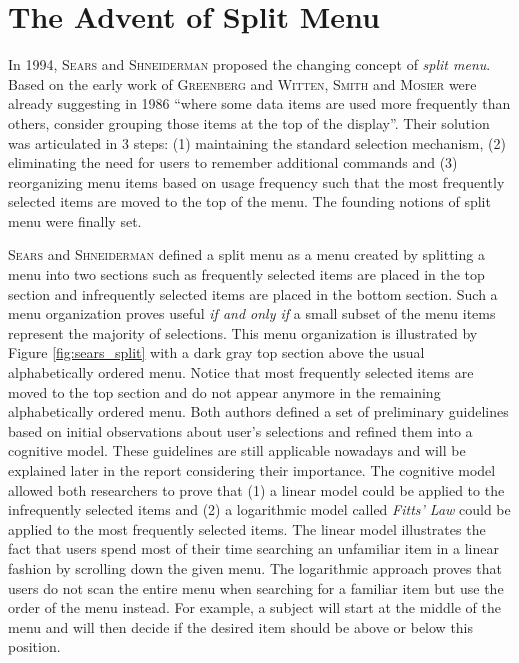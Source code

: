 \section{The Advent of Split Menu}

In 1994, \textsc{Sears} and \textsc{Shneiderman} \cite{sears} proposed the 
changing concept of 
\textit{split menu}. Based on the early work of \textsc{Greenberg} and 
\textsc{Witten}, \textsc{Smith} and 
\textsc{Mosier} \cite{smith_mosier} were already suggesting in 1986 
\enquote{where some 
data items are used more frequently than others, consider grouping those items 
at the top of the display}. Their solution was articulated in 3 steps: (1) 
maintaining the standard selection mechanism, (2) eliminating the need for 
users to remember additional commands and (3) reorganizing menu items based on 
usage frequency such that the most frequently selected items are moved to the 
top of the menu. 
The founding notions of split menu were finally set.\newline

\textsc{Sears} and \textsc{Shneiderman} defined a split menu as a menu created 
by splitting a menu 
into two sections such as frequently selected items are placed in the top 
section and infrequently selected items are placed in the bottom section. Such 
a 
menu organization proves useful \textit{if and only if} a small subset of the 
menu items represent the majority of selections. This menu organization is 
illustrated by Figure \ref{fig:sears_split} with a dark gray top section above 
the usual alphabetically ordered menu. Notice that most frequently 
selected items are moved to the top section and do not appear anymore in the 
remaining alphabetically ordered menu. Both authors defined a set of 
preliminary guidelines based on initial observations about user's selections 
and refined them into a cognitive model. These guidelines are still applicable 
nowadays and will be explained later in the report considering their 
importance. 
The cognitive model allowed both researchers to prove that (1) a linear model 
could be applied to the infrequently selected items and (2) a logarithmic model 
called \textit{Fitts’ Law} could be applied to the most frequently selected 
items. The linear model illustrates the fact that users spend most of their 
time 
searching an unfamiliar item in a linear fashion by scrolling down the 
given menu. The logarithmic approach proves that users do not scan the entire 
menu when searching for a familiar item but use the order of the menu instead. 
For example, a subject will start at the middle of the menu and will then 
decide 
if the desired item should be above or below this position.\newline

